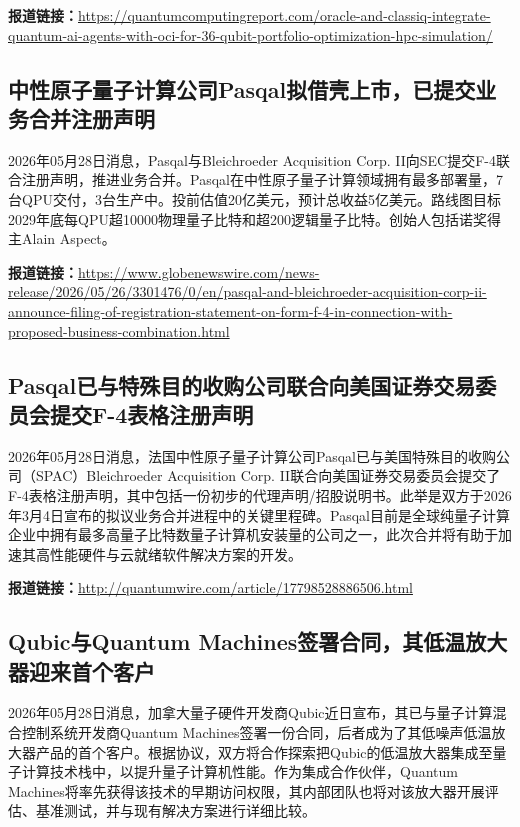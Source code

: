 \documentclass[12pt,a4paper]{ctexart}
\begin{document}
\noindent\textbf{报道链接：}\url{https://quantumcomputingreport.com/oracle-and-classiq-integrate-quantum-ai-agents-with-oci-for-36-qubit-portfolio-optimization-hpc-simulation/}

\subsection{ 中性原子量子计算公司Pasqal拟借壳上市，已提交业务合并注册声明 }

2026年05月28日消息，Pasqal与Bleichroeder Acquisition Corp. II向SEC提交F-4联合注册声明，推进业务合并。Pasqal在中性原子量子计算领域拥有最多部署量，7台QPU交付，3台生产中。投前估值20亿美元，预计总收益5亿美元。路线图目标2029年底每QPU超10000物理量子比特和超200逻辑量子比特。创始人包括诺奖得主Alain Aspect。

\noindent\textbf{报道链接：}\url{https://www.globenewswire.com/news-release/2026/05/26/3301476/0/en/pasqal-and-bleichroeder-acquisition-corp-ii-announce-filing-of-registration-statement-on-form-f-4-in-connection-with-proposed-business-combination.html}

\subsection{ Pasqal已与特殊目的收购公司联合向美国证券交易委员会提交F-4表格注册声明 }

2026年05月28日消息，法国中性原子量子计算公司Pasqal已与美国特殊目的收购公司（SPAC）Bleichroeder Acquisition Corp. II联合向美国证券交易委员会提交了F-4表格注册声明，其中包括一份初步的代理声明/招股说明书。此举是双方于2026年3月4日宣布的拟议业务合并进程中的关键里程碑。Pasqal目前是全球纯量子计算企业中拥有最多高量子比特数量子计算机安装量的公司之一，此次合并将有助于加速其高性能硬件与云就绪软件解决方案的开发。

\noindent\textbf{报道链接：}\url{http://quantumwire.com/article/17798528886506.html}

\subsection{ Qubic与Quantum Machines签署合同，其低温放大器迎来首个客户 }

2026年05月28日消息，加拿大量子硬件开发商Qubic近日宣布，其已与量子计算混合控制系统开发商Quantum Machines签署一份合同，后者成为了其低噪声低温放大器产品的首个客户。根据协议，双方将合作探索把Qubic的低温放大器集成至量子计算技术栈中，以提升量子计算机性能。作为集成合作伙伴，Quantum Machines将率先获得该技术的早期访问权限，其内部团队也将对该放大器开展评估、基准测试，并与现有解决方案进行详细比较。
\end{document}

